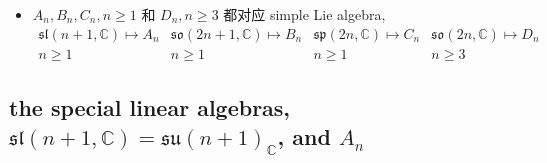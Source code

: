 \begin{itemize}
\begin{itemize}
		\item $A_n, B_n, C_n, n \geq 1$ 和 $D_n, n \geq 3$ 都对应 simple Lie algebra,
		\begin{equation}
			\begin{array}{cccc}
				\mathfrak{sl}(n + 1, \mathbb{C}) \mapsto A_n & \mathfrak{so}(2 n + 1, \mathbb{C}) \mapsto B_n & \mathfrak{sp}(2 n, \mathbb{C}) \mapsto C_n & \mathfrak{so}(2 n, \mathbb{C}) \mapsto D_n \\
				n \geq 1 & n \geq 1 & n \geq 1 & n \geq 3
			\end{array}
		\end{equation}
	\end{itemize}
\end{itemize}

\subsection{the special linear algebras, \texorpdfstring{$\mathfrak{sl}(n + 1, \mathbb{C}) = \mathfrak{su}(n + 1)_\mathbb{C}$}{sl(n + 1, C) = su(n + 1)\_C}, and \texorpdfstring{$A_n$}{A\_n}}
